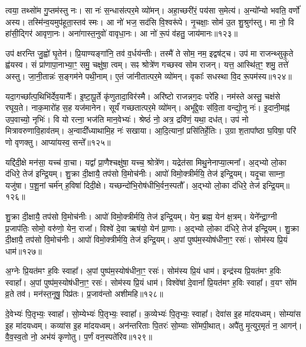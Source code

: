 त्वया॒ तथ्सो॑म गु॒प्तम॑स्तु नः।
सा नः॑ स॒न्धास॑त्पर॒मे व्यो॑मन्।
अहा॒च्छरी॑रं॒ पय॑सा स॒मेत्य॑।
अ॒न्यो᳚न्यो भवति॒ वर्णो॑ अस्य।
तस्मि॑न्व॒यमुप॑हूता॒स्तव॑ स्मः।
आ नो॑ भज॒ सद॑सि वि॒श्वरू॑पे।
नृ॒चक्षाः॒ सोम॑ उ॒त शु॒श्रुग॑स्तु।
मा नो॒ वि हा॑सी॒द्गिर॑ आवृणा॒नः।
अना॑गास्त॒नुवो॑ वावृधा॒नः।
आ नो॑ रू॒पं व॑हतु॒ जाय॑मानः॥१२३॥\ip

उप॑ क्षरन्ति जु॒ह्वो॑ घृ॒तेन॑।
प्रि॒याण्यङ्गा॑नि॒ तव॑ व॒र्धय॑न्तीः।
तस्मै॑ ते सोम॒ नम॒ इद्वष॑ट्च।
उप॑ मा राजन्थ्सुकृ॒ते ह्व॑यस्व।
सं प्रा॑णापा॒नाभ्या॒ꣳ॒ समु॒ चक्षु॑षा॒ त्वम्।
सꣴ श्रोत्रे॑ण गच्छस्व सोम राजन्।
यत्त॒ आस्थि॑त॒ꣳ॒ शमु॒ तत्ते॑ अस्तु।
जा॒नी॒तान्नः॑ स॒ङ्गम॑ने पथी॒नाम्।
ए॒तं जा॑नीतात्पर॒मे व्यो॑मन्।
वृकाः᳚ सधस्था वि॒द रू॒पम॑स्य॥१२४॥\ip

यदा॒गच्छा᳚त्प॒थिभि॑र्देव॒यानैः᳚।
इ॒ष्टा॒पू॒र्ते कृ॑णुतादा॒विर॑स्मै।
अरि॑ष्टो राजन्नग॒दः परे॑हि।
नम॑स्ते अस्तु॒ चक्ष॑से रघूय॒ते।
नाक॒मारो॑ह स॒ह यज॑मानेन।
सूर्यं॑ गच्छतात्पर॒मे व्यो॑मन्।
अभू᳚द्दे॒वः स॑वि॒ता वन्द्यो॒नु नः॑।
इ॒दानी॒मह्न॑ उप॒वाच्यो॒ नृभिः॑।
वि यो रत्ना॒ भज॑ति मान॒वेभ्यः॑।
श्रेष्ठं॑ नो॒ अत्र॒ द्रवि॑णं॒ यथा॒ दध॑त्।
उप॑ नो मित्रावरुणावि॒हाव॑तम्।
अ॒न्वादी᳚ध्याथामि॒ह नः॑ सखाया।
आ॒दि॒त्यानां॒ प्रसि॑तिर्\mbox{}हे॒तिः।
उ॒ग्रा श॒तापा᳚ष्ठा घ॒विषा॒ परि॑ णो वृणक्तु।
आप्या॑यस्व॒ सन्ते᳚॥१२५॥\ip\anuvakamend[त्मना॒ जाय॑मानो\-ऽस्य॒ दध॒त्पञ्च॑ च]

यद्दि॑दी॒क्षे मन॑सा॒ यच्च॑ वा॒चा।
यद्वा᳚ प्रा॒णैश्चक्षु॑षा॒ यच्च॒ श्रोत्रे॑ण।
यद्रेत॑सा मिथु॒नेनाप्या॒त्मना᳚।
अ॒द्भ्यो लो॒का द॑धिरे॒ तेज॑ इन्द्रि॒यम्।
शु॒क्रा दी॒क्षायै॒ तप॑सो वि॒मोच॑नीः।
आपो॑ विमो॒क्त्रीर्मयि॒ तेज॑ इन्द्रि॒यम्।
यदृ॒चा साम्ना॒ यजु॑षा।
प॒शू॒नां चर्म॑न् ह॒विषा॑ दिदी॒क्षे।
यच्छन्दो॑भि॒रोष॑धीभि॒र्वन॒स्पतौ᳚।
अ॒द्भ्यो लो॒का द॑धिरे॒ तेज॑ इन्द्रि॒यम्॥१२६॥\ip

शु॒क्रा दी॒क्षायै॒ तप॑सो वि॒मोच॑नीः।
आपो॑ विमो॒क्त्रीर्मयि॒ तेज॑ इन्द्रि॒यम्।
येन॒ ब्रह्म॒ येन॑ क्ष॒त्रम्।
येने᳚न्द्रा॒ग्नी प्र॒जा\-प॑तिः॒ सोमो॒ वरु॑णो॒ येन॒ राजा᳚।
विश्वे॑ दे॒वा ऋष॑यो॒ येन॑ प्रा॒णाः।
अ॒द्भ्यो लो॒का द॑धिरे॒ तेज॑ इन्द्रि॒यम्।
शु॒क्रा दी॒क्षायै॒ तप॑सो वि॒मोच॑नीः।
आपो॑ विमो॒क्त्रीर्मयि॒ तेज॑ इन्द्रि॒यम्।
अ॒पां पुष्प॑म॒स्योष॑धीना॒ꣳ॒ रसः॑।
सोम॑स्य प्रि॒यं धाम॑॥१२७॥\ip

अ॒ग्नेः प्रि॒यत॑मꣳ ह॒विः स्वाहा᳚।
अ॒पां पुष्प॑म॒स्योष॑धीना॒ꣳ॒ रसः॑।
सोम॑स्य प्रि॒यं धाम॑।
इन्द्र॑स्य प्रि॒यत॑मꣳ ह॒विः स्वाहा᳚।
अ॒पां पुष्प॑म॒स्योष॑धीना॒ꣳ॒ रसः॑।
सोम॑स्य प्रि॒यं धाम॑।
विश्वे॑षां दे॒वानां᳚ प्रि॒यत॑मꣳ ह॒विः स्वाहा᳚।
व॒यꣳ सो॑म व्र॒ते तव॑।
मन॑स्त॒नूषु॒ पिप्र॑तः।
प्र॒जाव॑न्तो अशीमहि॥१२८॥\ip

दे॒वेभ्यः॑ पि॒तृभ्यः॒ स्वाहा᳚।
सो॒म्येभ्यः॑ पि॒तृभ्यः॒ स्वाहा᳚।
क॒व्येभ्यः॑ पि॒तृभ्यः॒ स्वाहा᳚।
देवा॑स इ॒ह मा॑दयध्वम्।
सोम्या॑स इ॒ह मा॑दयध्वम्।
कव्या॑स इ॒ह मा॑दयध्वम्।
अन॑न्तरिताः पि॒तरः॑ सो॒म्याः सो॑मपी॒थात्।
अपै॑तु मृ॒त्युर॒मृतं॑ न॒ आगन्॑।
वै॒व॒स्व॒तो नो॒ अभ॑यं कृणोतु।
प॒र्णं वन॒स्पते॑रिव॥१२९॥\ip

